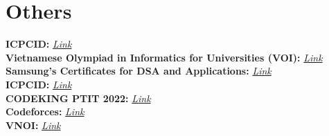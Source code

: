 \documentclass[letterpaper,11pt]{article}
\newcommand{\resumeSubHeadingListStart}{\begin{itemize}[leftmargin=0.15in, label={}]}
\newcommand{\resumeSubHeadingListEnd}{\end{itemize}}
\begin{document}
\section{Others}
  \vspace{2pt}
  \resumeSubHeadingListStart
  \small{\item{
        
  \textbf{ICPCID: }{ \emph{\href{https://icpc.global/ICPCID/DO3D9RLNRDX8}{\color{red}Link}}} \\ \vspace{3pt}
  \textbf{Vietnamese Olympiad in Informatics for Universities (VOI): }{ \emph{\href{https://drive.google.com/file/d/17VevlBhBMuU_wrVzSMOtZyQzstWhlA-Q/view?usp=sharing}{\color{red}Link}}} \\ \vspace{3pt}
  \textbf{Samsung's Certificates for DSA and Applications: }{ \emph{\href{https://drive.google.com/file/d/1kNnWVGgaUS-IkM80B9xVpEJmoQGsRhfZ/view?usp=sharing}{\color{red}Link}}} \\ \vspace{3pt}
  \textbf{ICPCID: }{ \emph{\href{https://icpc.global/ICPCID/DO3D9RLNRDX8}{\color{red}Link}}} \\ \vspace{3pt}
  \textbf{CODEKING PTIT 2022: }{ \emph{\href{https://www.facebook.com/ITPTIT/photos/a.679487585460391/5532805340128567/}{\color{red}Link}}} \\ \vspace{3pt}
  \textbf{Codeforces: }{ \emph{\href{https://codeforces.com/profile/Ignr_h31}{\color{red}Link}}} \\ \vspace{3pt}
  \textbf{VNOI: }{ \emph{\href{https://oj.vnoi.info/user/huys31}{\color{red}Link}}} \\ \vspace{3pt}
}}
  \resumeSubHeadingListEnd



\end{document}
